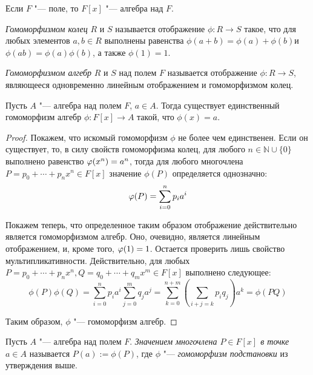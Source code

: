 \begin{note}
	Если $F$ "--- поле, то $F[x]$ "--- алгебра над $F$.
\end{note}

\begin{definition}
	\textit{Гомоморфизмом колец} $R$ и $S$ называется отображение $\phi: R \rightarrow S$ такое, что для любых элементов $a, b \in R$ выполнены равенства $\phi(a + b) = \phi(a) + \phi(b)$и $\phi(ab) = \phi(a)\phi(b)$, а также $\phi(1) = 1$.
\end{definition}

\begin{definition}
	\textit{Гомоморфизмом алгебр} $R$ и $S$ над полем $F$ называется отображение $\phi: R \rightarrow S$, являющееся одновременно линейным отображением и гомоморфизмом колец.
\end{definition}

\begin{proposition}
	Пусть $A$ "--- алгебра над полем $F$, $a \in A$. Тогда существует единственный гомоморфизм алгебр $\phi: F[x] \rightarrow A$ такой, что $\phi(x) = a$.
\end{proposition}

\begin{proof}
	Покажем, что искомый гомоморфизм $\phi$ не более чем единственен. Если он существует, то, в силу свойств гомоморфизма колец, для любого $n \in \mathbb{N} \cup \{0\}$ выполнено равенство $\phi(x^n) \hm{=} a^n$, тогда для любого многочлена $P = p_0 + \dotsb + p_nx^n \in F[x]$ значение $\phi(P)$ определяется однозначно:
	\[\phi(P) \hm{=} \sum_{i = 0}^{n}p_ia^i\]
	
	Покажем теперь, что определенное таким образом отображение действительно является гомоморфизмом алгебр. Оно, очевидно, является линейным отображением, и, кроме того, $\phi(1) \hm{=} 1$. Остается проверить лишь свойство мультипликативности. Действительно, для любых $P = p_0 + \dotsb + p_nx^n, Q = q_0 + \dotsb + q_mx^m \in F[x]$ выполнено следующее:
	\[\phi(P)\phi(Q) = \sum_{i = 0}^np_ia^i\sum_{j = 0}^mq_ja^j = \sum_{k = 0}^{n + m}\left(\sum_{i + j = k}p_iq_j\right)a^k = \phi(PQ)\]
	
	Таким образом, $\phi$ "--- гомоморфизм алгебр.
\end{proof}

\begin{definition}
	Пусть $A$ "--- алгебра над полем $F$. \textit{Значением многочлена $P \in F[x]$ в точке $a \in A$} называется $P(a) := \phi(P)$, где $\phi$ "--- \textit{гомоморфизм подстановки} из утверждения выше.
\end{definition}

